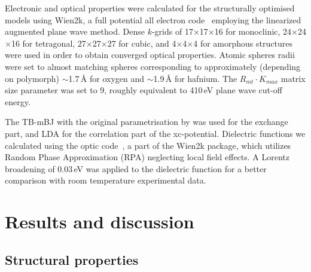 \documentclass[10pt,a4paper,twocolumn]{article}
\begin{document}
Electronic and optical properties were calculated for the structurally optimised models using Wien2k, a full potential all electron code~\cite{Blaha2001} employing the linearized augmented plane wave method.
Dense $k$-grids of 17$\times$17$\times$16 for monoclinic, 24$\times$24$\times$16 for tetragonal, 27$\times$27$\times$27 for cubic, and 4$\times$4$\times$4 for amorphous structures were used in order to obtain converged optical properties.
Atomic spheres radii were set to almost matching spheres corresponding to approximately (depending on polymorph) $\sim$1.7\,\AA{} for oxygen and $\sim$1.9\,\AA{} for hafnium.
The $R_{mt} \cdot K_{max}$ matrix size parameter was set to 9, roughly equivalent to 410\,eV plane wave cut-off energy.

The TB-mBJ with the original parametrisation by \citet{Tran2009} was used for the exchange part, and LDA for the correlation part of the xc-potential. Dielectric functions we calculated using the optic code~\cite{AmbroschDraxl2006}, a part of the Wien2k package, which utilizes Random Phase Approximation (RPA) neglecting local field effects.
A Lorentz broadening of 0.03\,eV was applied to the dielectric function for a better comparison with room temperature experimental data.

\section{Results and discussion}

\subsection{Structural properties}
\end{document}
